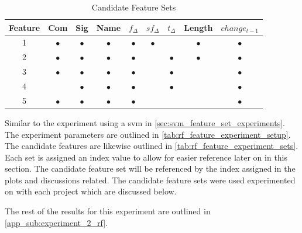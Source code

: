 \begin{table}[h]
\begin{center}

    \begin{tabular}{|c|c|c|c|c|c|c|c|c|}
        \hline
        Feature & Com & Sig & Name & $f_{\Delta}$ & $sf_{\Delta}$ & $t_\Delta$ & Length & $change_{t-1}$ \\
         \hline
        1 & $\bullet$ & $\bullet$ & $\bullet$ & $\bullet$ & $\bullet$ & & $\bullet$ & $\bullet$ \\
        2 & $\bullet$ & $\bullet$ & $\bullet$ & $\bullet$ & & $\bullet$ & $\bullet$ & $\bullet$ \\
        3 & $\bullet$ & $\bullet$ & $\bullet$ & $\bullet$ & & $\bullet$ & & $\bullet$ \\
        4 & & $\bullet$ & $\bullet$ & $\bullet$ & & $\bullet$ & & $\bullet$ \\
        5 & $\bullet$ & $\bullet$ & $\bullet$ & $\bullet$ & & & & $\bullet$ \\ \hline
    \end{tabular}
    \caption{Candidate Feature Sets}
    \label{tab:rf_feature_experiment_sets}
\end{center}

\end{table}

Similar to the experiment using a \gls{svm} in \autoref{sec:svm_feature_set_experiments}. The experiment parameters are outlined in \autoref{tab:rf_feature_experiment_setup}. The candidate features are likewise outlined in \autoref{tab:rf_feature_experiment_sets}. Each set is assigned an index value to allow for easier reference later on in this section. The candidate feature set will be referenced by the index assigned in the plots and discussions related. The candidate feature sets were used experimented on with each project which are discussed below.

The rest of the results for this experiment are outlined in \autoref{app_sub:experiment_2_rf}.


